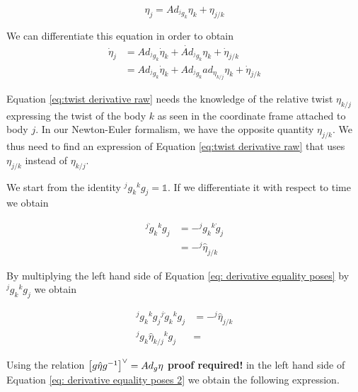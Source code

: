 \documentclass[12pt,a4paper]{book}
\begin{document}
\begin{equation}\label{eq: twist definition}
	\eta_j = Ad_{^j g_k} \eta_k + \eta_{j/k}
\end{equation}

We can differentiate this equation in order to obtain 
\begin{equation}\label{eq:twist derivative raw}
\begin{aligned}
	\dot{\eta}_j 	&= Ad_{^jg_k} \dot{\eta}_k + \dot{Ad}_{^jg_k} \eta_k + \dot{\eta}_{j/k} \\
					&= Ad_{^jg_k} \dot{\eta}_k + Ad_{^jg_k} ad_{\eta_{k/j}} \eta_k + \dot{\eta}_{j/k} 
\end{aligned}
\end{equation}

Equation \eqref{eq:twist derivative raw} needs the knowledge of the relative twist $\eta_{k/j}$ expressing the twist of the body $k$ as seen in the coordinate frame attached to body $j$. In our Newton-Euler formalism, we have the opposite quantity $\eta_{j/k}$. We thus need to find an expression of Equation \eqref{eq:twist derivative raw} that uses $\eta_{j/k}$ instead of $\eta_{k/j}$.


We start from the identity ${^jg_k}{^kg_j} = \mathbb{1}$. If we differentiate it with respect to time we obtain 

\begin{equation}\label{eq: derivative equality poses}
\begin{aligned}
	{^j\dot{g}_k}{^kg_j} 	&= - {^jg_k}{^k\dot{g}_j} \\
							&= - {^j} \hat{\eta}_{j/k}
\end{aligned}
\end{equation}


By multiplying the left hand side of Equation \eqref{eq: derivative equality poses} by ${^jg_k}{^kg_j}$ we obtain


\begin{equation}\label{eq: derivative equality poses 2}
\begin{aligned}
	{^jg_k}{^kg_j}{^j\dot{g}_k}{^kg_j} 	&= - {^j} \hat{\eta}_{j/k}\\
	{^jg_k} \hat{\eta}_{k/j}{^kg_j}		&= 
\end{aligned}
\end{equation}

Using the relation $\left[ g \hat{\eta} g ^{-1} \right]^\vee = Ad_g \eta $ \color{red}\textbf{proof required!}\color{black} in the left hand side of Equation \eqref{eq: derivative equality poses 2} we obtain the following expression.
\end{document}

